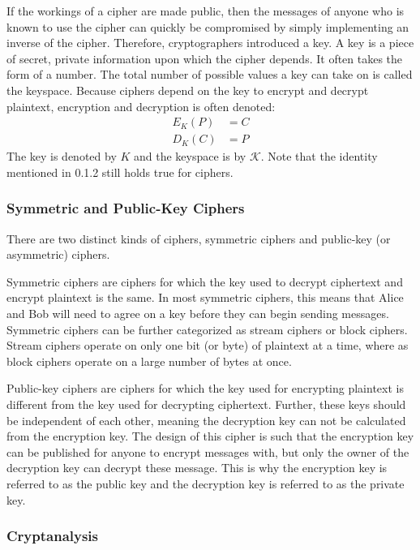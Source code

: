 \documentclass[12pt, a4paper, final]{report}
\begin{document}
If the workings of a cipher are made public, then the messages
of anyone who is known to use the cipher can quickly be compromised
by simply implementing an inverse of the cipher. Therefore, cryptographers
introduced a key. A key is a piece of secret, private information
upon which the cipher depends. It often takes the form of a number.
The total number of possible values a key can take on is called the
keyspace. Because ciphers depend on the key to encrypt and decrypt
plaintext, encryption and decryption is often denoted:
\begin{align*}
    E_K(P) & = C\\
    D_K(C) & = P
\end{align*}
The key is denoted by $K$ and the keyspace is by $\mathcal{K}$. Note that
the identity mentioned in 0.1.2 still holds true for ciphers.

\subsubsection{Symmetric and Public-Key Ciphers}

There are two distinct kinds of ciphers, symmetric ciphers and public-key
(or asymmetric) ciphers.

Symmetric ciphers are ciphers for which the key used to decrypt ciphertext
and encrypt plaintext is the same. In most symmetric ciphers, this means
that Alice and Bob will need to agree on a key before they can begin
sending messages. Symmetric ciphers can be further categorized as stream
ciphers or block ciphers. Stream ciphers operate on only one bit (or byte)
of plaintext at a time, where as block ciphers operate on a large number
of bytes at once.

Public-key ciphers are ciphers for which the key used for encrypting
plaintext is different from the key used for decrypting ciphertext.
Further, these keys should be independent of each other, meaning the
decryption key can not be calculated from the encryption key.
The design of this cipher is such that the encryption key can be published
for anyone to encrypt messages with, but only the owner of the decryption key
can decrypt these message. This is why the encryption key is referred to as the
public key and the decryption key is referred to as the private key.

\subsubsection{Cryptanalysis}
\end{document}
